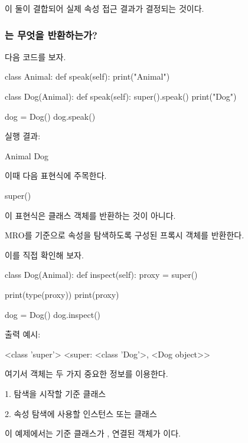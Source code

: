 이 둘이 결합되어 실제 속성 접근 결과가 결정되는 것이다.

\subsubsection{는 무엇을 반환하는가?}

다음 코드를 보자.

\begin{dhkcode}
class Animal:
    def speak(self):
        print("Animal")


class Dog(Animal):
    def speak(self):
        super().speak()
        print("Dog")

dog = Dog()
dog.speak()
\end{dhkcode}

실행 결과:

\begin{dhkzsh}
Animal
Dog
\end{dhkzsh}

이때 다음 표현식에 주목한다.

\begin{dhkcode}
super()
\end{dhkcode}

이 표현식은  클래스 객체를 반환하는 것이 아니다.

MRO를 기준으로 속성을 탐색하도록 구성된  프록시 객체를 반환한다.

이를 직접 확인해 보자.

\begin{dhkcode}
class Dog(Animal):
    def inspect(self):
        proxy = super()

        print(type(proxy))
        print(proxy)

dog = Dog()
dog.inspect()
\end{dhkcode}

출력 예시:

\begin{dhkzsh}
<class 'super'>
<super: <class 'Dog'>, <Dog object>>
\end{dhkzsh}

여기서  객체는 두 가지 중요한 정보를 이용한다.

\begin{dhksmry}
1. 탐색을 시작할 기준 클래스

2. 속성 탐색에 사용할 인스턴스 또는 클래스
\end{dhksmry}

이 예제에서는 기준 클래스가 , 연결된 객체가 이다.

